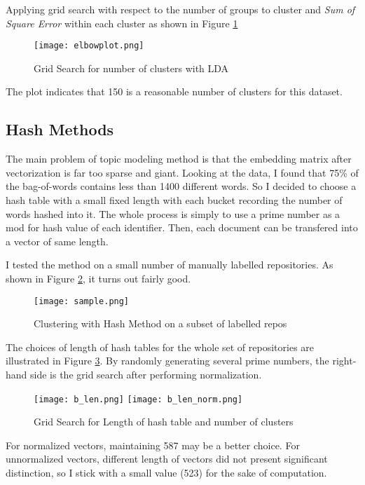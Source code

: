 Applying grid search with respect to the number of groups to cluster and
\emph{Sum of Square Error} within each cluster as shown in Figure
\ref{figure:GSclusterLDA}

\begin{figure}[h]
  \centering
  \texttt{[image: elbowplot.png]}
  \caption{Grid Search for number of clusters with LDA}
  \label{figure:GSclusterLDA}
\end{figure}

The plot indicates that 150 is a reasonable number of clusters for this
dataset.

\hypertarget{hash-methods}{%
\subsection{Hash Methods}\label{hash-methods}}

The main problem of topic modeling method is that the embedding matrix
after vectorization is far too sparse and giant. Looking at the data, I
found that 75\% of the bag-of-words contains less than 1400 different
words. So I decided to choose a hash table with a small fixed length
with each bucket recording the number of words hashed into it. The whole
process is simply to use a prime number as a mod for hash value of each
identifier. Then, each document can be transfered into a vector of same
length.

I tested the method on a small number of manually labelled repositories.
As shown in Figure \ref{figure:hashsample}, it turns out fairly good.

\begin{figure}[h]
  \centering
  \texttt{[image: sample.png]}
  \caption{Clustering with Hash Method on a subset of labelled repos}
  \label{figure:hashsample}
\end{figure}

The choices of length of hash tables for the whole set of repositories
are illustrated in Figure \ref{figure:GSclusterhash}. By randomly
generating several prime numbers, the right-hand side is the grid search
after performing normalization.

\begin{figure}[h]
  \centering
  \texttt{[image: b\_len.png]}
  \texttt{[image: b\_len\_norm.png]}
  \caption{Grid Search for Length of hash table and number of clusters}
  \label{figure:GSclusterhash}
\end{figure}

For normalized vectors, maintaining 587 may be a better choice. For
unnormalized vectors, different length of vectors did not present
significant distinction, so I stick with a small value (523) for the
sake of computation.


